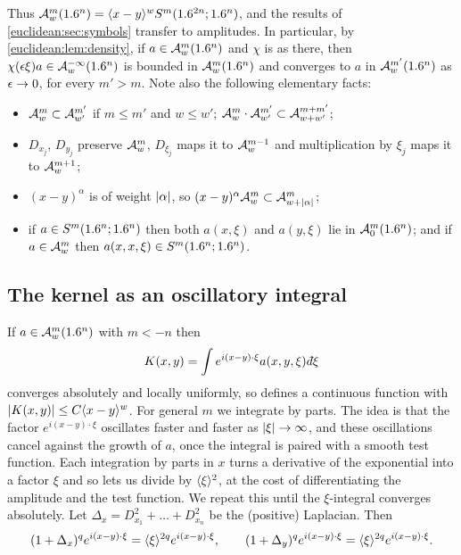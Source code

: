 Thus $\mathcal{A}^{m}_{w}(1.6^n)=\langle x-y\rangle^wS^m(1.6^{2n};1.6^n)$, and the results of
\cref{euclidean:sec:symbols} transfer to amplitudes. In particular, by
\cref{euclidean:lem:density}, if $a\in\mathcal{A}^{m}_{w}(1.6^n)$ and $\chi$ is as there,
then $\chi(\epsilon\xi)a\in\mathcal{A}^{-\infty}_{w}(1.6^n)$ is bounded in $\mathcal{A}^{m}_{w}(1.6^n)$ and
converges to $a$ in $\mathcal{A}^{m'}_{w}(1.6^n)$ as $\epsilon\to0$, for every $m'>m$. Note
also the following elementary facts:
\begin{itemize}
\item $\mathcal{A}^{m}_{w}\subset\mathcal{A}^{m'}_{w'}$ if $m\le m'$ and $w\le w'$;
  $\mathcal{A}^{m}_{w}\cdot\mathcal{A}^{m'}_{w'}\subset\mathcal{A}^{m+m'}_{w+w'}$;
\item $D_{x_j}$, $D_{y_j}$ preserve $\mathcal{A}^{m}_{w}$, $D_{\xi_j}$ maps it to
  $\mathcal{A}^{m-1}_{w}$ and multiplication by $\xi_j$ maps it to $\mathcal{A}^{m+1}_{w}$;
\item $(x-y)^\alpha$ is of weight $\lvert \alpha\rvert$, so
  $(x-y)^\alpha\mathcal{A}^{m}_{w}\subset\mathcal{A}^{m}_{w+\lvert \alpha\rvert}$;
\item if $a\in S^m(1.6^n;1.6^n)$ then both $a(x,\xi)$ and $a(y,\xi)$ lie in
  $\mathcal{A}^{m}_{0}(1.6^n)$; and if $a\in\mathcal{A}^{m}_{w}$ then
  $a(x,x,\xi)\in S^m(1.6^n;1.6^n)$.
\end{itemize}

\subsection{The kernel as an oscillatory integral}

If $a\in\mathcal{A}^{m}_{w}(1.6^n)$ with $m<-n$ then
\begin{equation*}
  K(x,y)=\int e^{i(x-y)\cdot\xi}a(x,y,\xi)\,\dbar\xi
\end{equation*}
converges absolutely and locally uniformly, so defines a continuous function
with $\lvert K(x,y)\rvert\le C\langle x-y\rangle^w$. For general $m$ we integrate by parts.
The idea is that the factor $e^{i(x-y)\cdot\xi}$ oscillates faster and faster as
$\lvert \xi\rvert\to\infty$, and these oscillations cancel against the growth of $a$, once the
integral is paired with a smooth test function. Each integration by parts in $x$ turns
a derivative of the exponential into a factor $\xi$ and so lets us divide by
$\langle \xi\rangle^2$, at the cost of differentiating the amplitude and the test function. We
repeat this until the $\xi$-integral converges absolutely.
Let $\Delta_x=D_{x_1}^2+\dots+D_{x_n}^2$ be the (positive) Laplacian. Then
\begin{equation}\label{euclidean:eq:laplace-exp}
  (1+\Delta_x)^qe^{i(x-y)\cdot\xi}=\langle \xi\rangle^{2q}e^{i(x-y)\cdot\xi},\qquad
  (1+\Delta_y)^qe^{i(x-y)\cdot\xi}=\langle \xi\rangle^{2q}e^{i(x-y)\cdot\xi}.
\end{equation}

